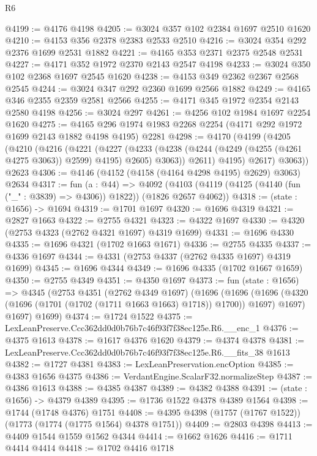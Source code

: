\begin{lexlean}{R6}
\begin{coremodule}
@4199 := @4176 @4198
@4205 := @3024 @357 @102 @2384 @1697 @2510 @1620
@4210 := @4153 @356 @2378 @2383 @2533 @2510
@4216 := @3024 @354 @292 @2376 @1699 @2531 @1882
@4221 := @4165 @353 @2371 @2375 @2548 @2531
@4227 := @4171 @352 @1972 @2370 @2143 @2547 @4198
@4233 := @3024 @350 @102 @2368 @1697 @2545 @1620
@4238 := @4153 @349 @2362 @2367 @2568 @2545
@4244 := @3024 @347 @292 @2360 @1699 @2566 @1882
@4249 := @4165 @346 @2355 @2359 @2581 @2566
@4255 := @4171 @345 @1972 @2354 @2143 @2580 @4198
@4256 := @3024 @297
@4261 := @4256 @102 @1984 @1697 @2254 @1620
@4275 := @4165 @296 @1974 @1983 @2268 @2254 (@4171 @292 @1972 @1699 @2143 @1882 @4198 @4195) @2281
@4298 := @4170
    (@4199
      (@4205
        (@4210
          (@4216
            (@4221
              (@4227
                (@4233 (@4238 (@4244 (@4249 (@4255 (@4261 @4275 @3063)) @2599) @4195) @2605) @3063))
              @2611)
            @4195)
          @2617)
        @3063))
    @2623
@4306 := @4146 (@4152 (@4158 (@4164 @4298 @4195) @2629) @3063) @2634
@4317 := fun (a : @44) =>
  @4092 (@4103 (@4119 (@4125 (@4140 (fun ("_" : @3839) => @4306)) @1822)) (@1826 @2657 @4062))
@4318 := (state : @1656) -> @1694
@4319 := @1701 @1697
@4320 := @1696 @4319
@4321 := @2827 @1663
@4322 := @2755 @4321
@4323 := @4322 @1697
@4330 := @4320 (@2753 @4323 (@2762 @4321 @1697) @4319 @1699)
@4331 := @1696 @4330
@4335 := @1696 @4321 (@1702 @1663 @1671)
@4336 := @2755 @4335
@4337 := @4336 @1697
@4344 := @4331 (@2753 @4337 (@2762 @4335 @1697) @4319 @1699)
@4345 := @1696 @4344
@4349 := @1696 @4335 (@1702 @1667 @1659)
@4350 := @2755 @4349
@4351 := @4350 @1697
@4373 := fun (state : @1656) =>
  @4345
    (@2753
      @4351
      (@2762 @4349 @1697)
      (@1696
        (@1696 (@1696 (@4320 (@1696 (@1701 (@1702 (@1711 @1663 @1663) @1718)) @1700)) @1697) @1697)
        @1697)
      @1699)
@4374 := @1724 @1522
@4375 := LexLeanPreserve.Ccc362dd0d0b76b7c46f93f7f38ec125e.R6.__enc_1
@4376 := @4375 @1613
@4378 := @1617 @4376 @1620
@4379 := @4374 @4378
@4381 := LexLeanPreserve.Ccc362dd0d0b76b7c46f93f7f38ec125e.R6.__fits_38 @1613
@4382 := @1727 @4381
@4383 := LexLeanPreservation.encOption
@4385 := @4383 @1656 @4375
@4386 := VerdantEngine.ScalarF32.normalizeStep
@4387 := @4386 @1613
@4388 := @4385 @4387
@4389 := @4382 @4388
@4391 := (state : @1656) -> @4379 @4389
@4395 := @1736 @1522 @4378 @4389 @1564
@4398 := @1744 (@1748 @4376) @1751
@4408 := @4395 @4398 (@1757 (@1767 @1522)) (@1773 (@1774 (@1775 @1564) @4378 @1751))
@4409 := @2803 @4398
@4413 := @4409 @1544 @1559 @1562 @4344
@4414 := @1662 @1626
@4416 := @1711 @4414 @4414
@4418 := @1702 @4416 @1718

\end{coremodule}
\end{lexlean}
